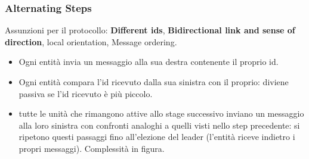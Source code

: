 \documentclass[12pt]{article}
\begin{document}
		\subsubsection{Alternating Steps}
			Assunzioni per il protocollo: \textbf{Different ids}, \textbf{Bidirectional link and sense of direction}, local orientation, Message ordering.
			\begin{itemize}
				\item Ogni entità invia un messaggio alla sua destra contenente il proprio id.
				\item Ogni entità compara l'id ricevuto dalla sua sinistra con il proprio: diviene passiva se l'id ricevuto è più piccolo.
				\item tutte le unità che rimangono attive allo stage successivo inviano un messaggio alla loro sinistra con confronti analoghi a quelli visti nello step precedente: si ripetono questi passaggi fino all'elezione del leader (l'entità riceve indietro i propri messaggi). Complessità in figura.
			\end{itemize}
			
\end{document}

